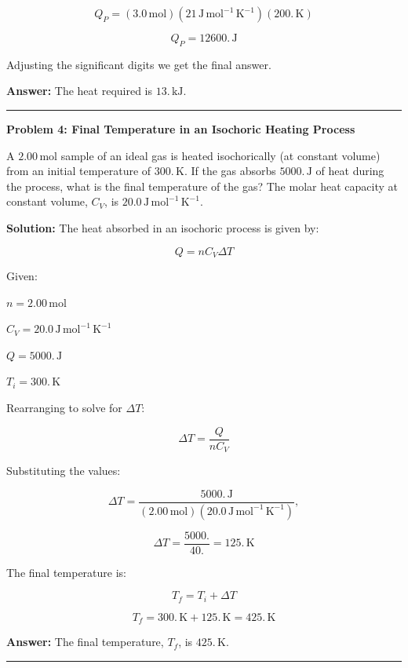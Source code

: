 \documentclass[
  9pt,
]{extbook}
\theoremstyle{definition}
\theoremstyle{definition}
\theoremstyle{definition}
\theoremstyle{remark}
\begin{document}
\[ Q_P = (3.0 \, \text{mol})(21 \, \text{J} \, \text{mol}^{-1} \, \text{K}^{-1})(200. \, \text{K}) \]

\[ Q_P = 12600. \, \text{J} \]

Adjusting the significant digits we get the final answer.

\textbf{Answer:} The heat required is \(13. \, \text{kJ}\).

\begin{center}\rule{0.5\linewidth}{0.5pt}\end{center}

\textbf{Problem 4: Final Temperature in an Isochoric Heating Process}

A \(2.00 \, \text{mol}\) sample of an ideal gas is heated isochorically (at constant volume) from an initial temperature of \(300. \, \text{K}\). If the gas absorbs \(5000. \, \text{J}\) of heat during the process, what is the final temperature of the gas? The molar heat capacity at constant volume, \(C_V\), is \(20.0 \, \text{J} \, \text{mol}^{-1} \, \text{K}^{-1}\).

\textbf{Solution:} The heat absorbed in an isochoric process is given by:

\[ Q = n C_V \Delta T \]

Given:

\(n = 2.00 \, \text{mol}\)

\(C_V = 20.0 \, \text{J} \, \text{mol}^{-1} \, \text{K}^{-1}\)

\(Q = 5000. \, \text{J}\)

\(T_i = 300. \, \text{K}\)

Rearranging to solve for \(\Delta T\):

\[ \Delta T = \frac{Q}{n C_V} \]

Substituting the values:

\[ \Delta T = \frac{5000. \, \text{J}}{(2.00\,\text{mol}) (20.0 \, \text{J} \, \text{mol}^{-1} \, \text{K}^{-1})},\]

\[ \Delta T = \frac{5000.}{40.} = 125. \, \text{K} \]

The final temperature is:

\[ T_f = T_i + \Delta T \]

\[ T_f = 300. \, \text{K} + 125. \, \text{K} = 425. \, \text{K} \]

\textbf{Answer:} The final temperature, \(T_f\), is \(425. \, \text{K}\).

\begin{center}\rule{0.5\linewidth}{0.5pt}\end{center}
\end{document}
